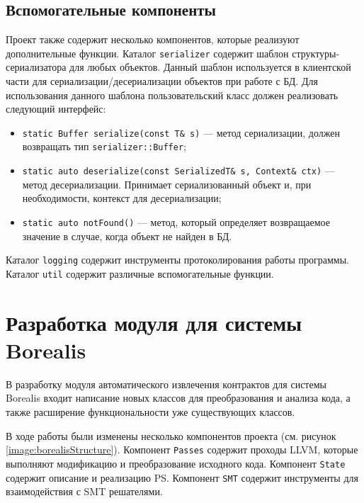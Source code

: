 \subsection{Вспомогательные компоненты}
Проект также содержит несколько компонентов, которые реализуют дополнительные функции. Каталог \texttt{serializer} содержит шаблон структуры-сериализатора для любых объектов. Данный шаблон используется в клиентской части для сериализации/десериализации объектов при работе с БД. Для использования данного шаблона пользовательский класс должен реализовать следующий интерфейс:
\begin{itemize}
\item \texttt{static Buffer serialize(const T\& s)} --- метод сериализации, должен возвращать тип \texttt{serializer::Buffer};
\item \texttt{static auto deserialize(const SerializedT\& s, Context\& ctx)} --- метод десериализации. Принимает сериализованный объект и, при необходимости, контекст для десериализации;
\item \texttt{static auto notFound()} --- метод, который определяет возвращаемое значение в случае, когда объект не найден в БД.
\end{itemize}

Каталог \texttt{logging} содержит инструменты протоколирования работы программы. Каталог \texttt{util} содержит различные вспомогательные функции.

\section{Разработка модуля для системы Borealis}
В разработку модуля автоматического извлечения контрактов для системы Borealis входит написание новых классов для преобразования и анализа кода, а также расширение функциональности уже существующих классов.

В ходе работы были изменены несколько компонентов проекта (см. рисунок \ref{image:borealisStructure}). Компонент \texttt{Passes} содержит проходы LLVM, которые выполняют модификацию и преобразование исходного кода. Компонент \texttt{State} содержит описание и реализацию PS. Компонент \texttt{SMT} содержит инструменты для взаимодействия с SMT решателями.

